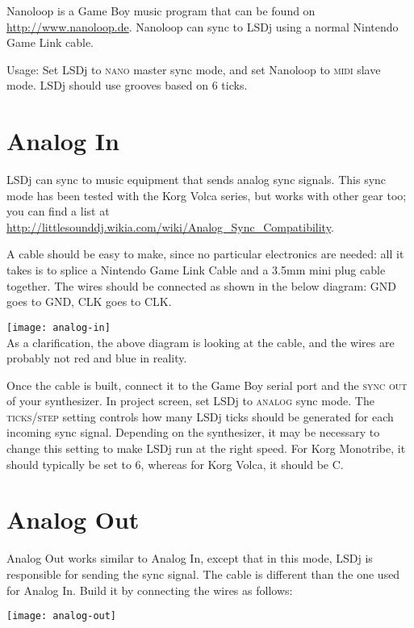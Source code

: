 Nanoloop is a Game Boy music program that can be found on \url{http://www.nanoloop.de}. Nanoloop can sync to LSDj using a normal Nintendo Game Link cable.

Usage: Set LSDj to \textsc{nano} master sync mode, and set Nanoloop to \textsc{midi} slave mode. LSDj should use grooves based on 6 ticks.

\section{Analog In}

LSDj can sync to music equipment that sends analog sync signals. This sync mode has been tested with the Korg Volca series, but works with other gear too; you can find a list at \url{http://littlesounddj.wikia.com/wiki/Analog_Sync_Compatibility}.

A cable should be easy to make, since no particular electronics are needed: all it takes is to splice a Nintendo Game Link Cable and a 3.5mm mini plug cable together. The wires should be connected as shown in the below diagram: GND goes to GND, CLK goes to CLK.

\texttt{[image: analog-in]}\\

As a clarification, the above diagram is looking at the cable, and the wires are probably not red and blue in reality.

Once the cable is built, connect it to the Game Boy serial port and the \textsc{sync out} of your synthesizer. In project screen, set LSDj to \textsc{analog} sync mode. The \textsc{ticks/step} setting controls how many LSDj ticks should be generated for each incoming sync signal. Depending on the synthesizer, it may be necessary to change this setting to make LSDj run at the right speed. For Korg Monotribe, it should typically be set to 6, whereas for Korg Volca, it should be C.

\section{Analog Out}

Analog Out works similar to Analog In, except that in this mode, LSDj is responsible for sending the sync signal. The cable is different than the one used for Analog In. Build it by connecting the wires as follows:

\texttt{[image: analog-out]}\\

